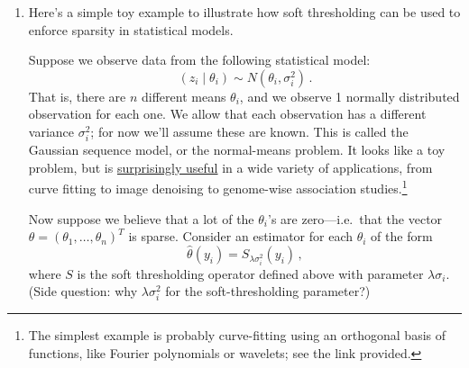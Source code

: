 \documentclass{article}
\begin{document}
\begin{enumerate}[label=(\Alph*)]
\item Here's a simple toy example to illustrate how soft thresholding can be used to enforce sparsity in statistical models.

Suppose we observe data from the following statistical model:
$$
(z_{i} \mid \theta_i) \sim N(\theta_i, \sigma^2_i) \, .
$$
That is, there are $n$ different means $\theta_i$, and we observe 1 normally distributed observation for each one.  We allow that each observation has a different variance $\sigma^2_i$; for now we'll assume these are known.  This is called the Gaussian sequence model, or the normal-means problem.  It looks like a toy problem, but is \href{http://statweb.stanford.edu/~imj/GE06-11-13.pdf}{surprisingly useful} in a wide variety of applications, from curve fitting to image denoising to genome-wise association studies.\footnote{The simplest example is probably curve-fitting using an orthogonal basis of functions, like Fourier polynomials or wavelets; see the link provided.}

Now suppose we believe that a lot of the $\theta_i$'s are zero---i.e.~that the vector $\theta = (\theta_1, \ldots, \theta_n)^T$ is sparse.  Consider an estimator for each $\theta_i$ of the form
$$
\widehat{\theta}(y_i) = S_{\lambda \sigma_i^2}(y_i) \, ,
$$
where $S$ is the soft thresholding operator defined above with parameter $\lambda \sigma_i$.  (Side question: why $\lambda \sigma_i^2$ for the soft-thresholding parameter?)


\end{enumerate}
\end{document}
